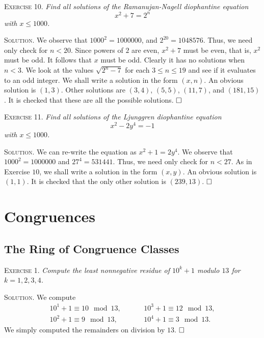 \documentclass[11pt, leqno]{article}
\newcommand{\done}{\ensuremath{\hfill\square}}
\begin{document}
\textsc{Exercise 10}. \emph{Find all solutions of the Ramanujan-Nagell diophantine equation 
\begin{displaymath}
x^2 + 7 = 2^n
\end{displaymath}
with $x \leq 1000$.}

\textsc{Solution}. We observe that $1000^2 = 1000000$, and $2^{20}  = 1048576$. Thus, we need only check for $n < 20$. Since powers of $2$ are even, $x^2 + 7$ must be even, that is, $x^2$ must be odd. It follows that $x$ must be odd. Clearly it has no solutions when $n < 3$. We look at the values $\sqrt{2^n - 7}$ for each $3 \leq n \leq 19$ and see if it evaluates to an odd integer. We shall write a solution in the form $(x,n)$. An obvious solution is $(1,3)$. Other solutions are $(3,4)$, $(5,5)$, $(11,7)$, and $(181, 15)$. It is checked that these are all the possible solutions. \done

\textsc{Exercise 11}. \emph{Find all solutions of the Ljunggren diophantine equation 
\begin{displaymath}
x^2 - 2y^4 = -1
\end{displaymath}
with $x \leq 1000$.}

\textsc{Solution}. We can re-write the equation as $x^2 + 1 = 2y^4$. We observe that $1000^2 = 1000000$ and $27^4 = 531441$. Thus, we need only check for $n < 27$. As in Exercise $10$, we shall write a solution in the form $(x,y)$. An obvious solution is $(1,1)$. It is checked that the only other solution is $(239, 13)$. \done
\clearpage

\section{Congruences}

\subsection{The Ring of Congruence Classes}

\textsc{Exercise 1}. \emph{Compute the least nonnegative residue of $10^k + 1$ modulo $13$ for $k = 1, 2, 3, 4$.}

\textsc{Solution}. We compute 
\begin{align*}
  10^1+1 \equiv 10 \mod 13, \hspace{1cm} &10^3+1 \equiv 12 \mod 13,\\
  10^2+1 \equiv 9 \mod 13, \hspace{1cm} &10^4+1 \equiv 3 \mod 13.
\end{align*}
We simply computed the remainders on division by $13$. \done
\end{document}
